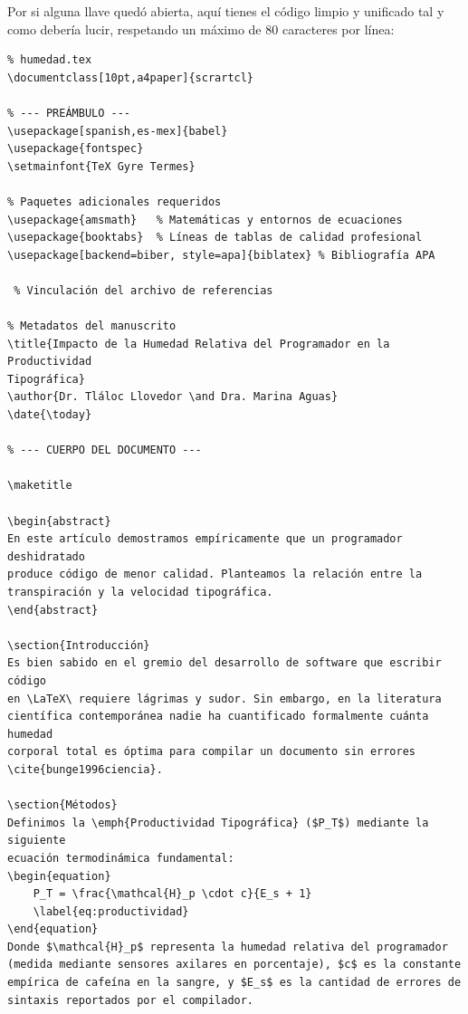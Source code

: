 Por si alguna llave quedó abierta, aquí tienes el código limpio y unificado
tal y como debería lucir, respetando un máximo de 80 caracteres por línea:

\begin{verbatim}
% humedad.tex
\documentclass[10pt,a4paper]{scrartcl} 

% --- PREÁMBULO ---
\usepackage[spanish,es-mex]{babel} 
\usepackage{fontspec}              
\setmainfont{TeX Gyre Termes}      

% Paquetes adicionales requeridos
\usepackage{amsmath}   % Matemáticas y entornos de ecuaciones
\usepackage{booktabs}  % Líneas de tablas de calidad profesional
\usepackage[backend=biber, style=apa]{biblatex} % Bibliografía APA

 % Vinculación del archivo de referencias

% Metadatos del manuscrito
\title{Impacto de la Humedad Relativa del Programador en la Productividad
Tipográfica}
\author{Dr. Tláloc Llovedor \and Dra. Marina Aguas}
\date{\today}

% --- CUERPO DEL DOCUMENTO ---

\maketitle

\begin{abstract}
En este artículo demostramos empíricamente que un programador deshidratado
produce código de menor calidad. Planteamos la relación entre la 
transpiración y la velocidad tipográfica.
\end{abstract}

\section{Introducción}
Es bien sabido en el gremio del desarrollo de software que escribir código
en \LaTeX\ requiere lágrimas y sudor. Sin embargo, en la literatura
científica contemporánea nadie ha cuantificado formalmente cuánta humedad
corporal total es óptima para compilar un documento sin errores
\cite{bunge1996ciencia}.

\section{Métodos}
Definimos la \emph{Productividad Tipográfica} ($P_T$) mediante la siguiente
ecuación termodinámica fundamental:
\begin{equation}
    P_T = \frac{\mathcal{H}_p \cdot c}{E_s + 1}
    \label{eq:productividad}
\end{equation}
Donde $\mathcal{H}_p$ representa la humedad relativa del programador
(medida mediante sensores axilares en porcentaje), $c$ es la constante
empírica de cafeína en la sangre, y $E_s$ es la cantidad de errores de
sintaxis reportados por el compilador.


\end{verbatim}
